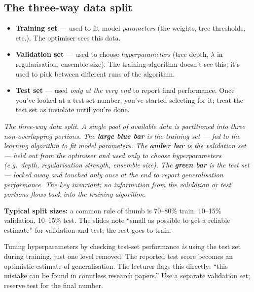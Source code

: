 \documentclass[11pt, a4paper]{article}
\begin{document}
\subsection{The three-way data split}

\begin{defbox}
\begin{itemize}
  \item \textbf{Training set} — used to fit model \emph{parameters} (the weights, tree thresholds, etc.). The optimiser sees this data.
  \item \textbf{Validation set} — used to choose \emph{hyperparameters} (tree depth, $\lambda$ in regularisation, ensemble size). The training algorithm doesn't see this; it's used to pick between different runs of the algorithm.
  \item \textbf{Test set} — used \emph{only at the very end} to report final performance. Once you've looked at a test-set number, you've started selecting for it; treat the test set as inviolate until you're done.
\end{itemize}
\end{defbox}

\begin{center}

\footnotesize\textit{The three-way data split. A single pool of available data is partitioned into three non-overlapping portions. The \textbf{large blue bar} is the training set --- fed to the learning algorithm to fit model parameters. The \textbf{amber bar} is the validation set --- held out from the optimiser and used only to choose hyperparameters (e.g.\ depth, regularisation strength, ensemble size). The \textbf{green bar} is the test set --- locked away and touched only once at the end to report generalisation performance. The key invariant: no information from the validation or test portions flows back into the training algorithm.}
\end{center}

\textbf{Typical split sizes:} a common rule of thumb is 70--80\% train, 10--15\% validation, 10--15\% test. The slides note ``small as possible to get a reliable estimate'' for validation and test; the rest goes to train.

\begin{pitfallbox}
Tuning hyperparameters by checking test-set performance \emph{is} using the test set during training, just one level removed. The reported test score becomes an optimistic estimate of generalisation. The lecturer flags this directly: ``this mistake can be found in countless research papers.'' Use a separate validation set; reserve test for the final number.
\end{pitfallbox}
\end{document}
